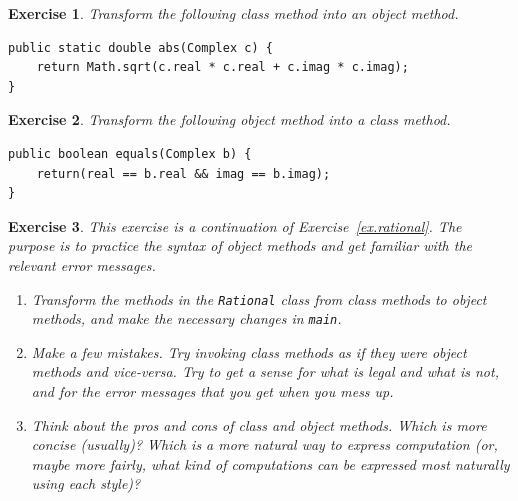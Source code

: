 \documentclass[12pt]{book}
\theoremstyle{exercise}
\newtheorem{exercise}{Exercise}[chapter]
\begin{document}
\begin{exercise}

Transform the following class method into an object method.

\begin{lstlisting}
public static double abs(Complex c) {
    return Math.sqrt(c.real * c.real + c.imag * c.imag);
}
\end{lstlisting}
\end{exercise}


\begin{exercise}
Transform the following object method into a class method.

\begin{lstlisting}
public boolean equals(Complex b) {
    return(real == b.real && imag == b.imag);
}
\end{lstlisting}
\end{exercise}


\begin{exercise}

This exercise is a continuation of Exercise~\ref{ex.rational}.
The purpose is to practice the syntax of object methods and
get familiar with the relevant error messages.

\begin{enumerate}

\item Transform the methods in the {\tt Rational} class
from class methods to object methods, and make the necessary
changes in {\tt main}.

\item Make a few mistakes.  Try invoking class methods as if
they were object methods and vice-versa.  Try to get a sense for
what is legal and what is not, and for the error messages that
you get when you mess up.

\item Think about the pros and cons of
class and object methods.  Which is more concise (usually)?
Which is a more natural way to express computation (or, maybe
more fairly, what kind of computations can be expressed most
naturally using each style)?

\end{enumerate}
\end{exercise}
\end{document}
